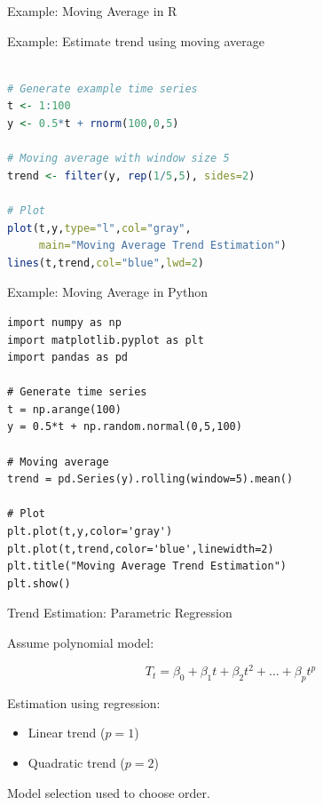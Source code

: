 \documentclass[aspectratio=169]{beamer}
\begin{document}
\begin{frame}[fragile]{Example: Moving Average in R}

Example: Estimate trend using moving average

\begin{lstlisting}[language=R]

# Generate example time series
t <- 1:100
y <- 0.5*t + rnorm(100,0,5)

# Moving average with window size 5
trend <- filter(y, rep(1/5,5), sides=2)

# Plot
plot(t,y,type="l",col="gray",
     main="Moving Average Trend Estimation")
lines(t,trend,col="blue",lwd=2)

\end{lstlisting}

\end{frame}
\begin{frame}[fragile]{Example: Moving Average in Python}

\begin{lstlisting}
import numpy as np
import matplotlib.pyplot as plt
import pandas as pd

# Generate time series
t = np.arange(100)
y = 0.5*t + np.random.normal(0,5,100)

# Moving average
trend = pd.Series(y).rolling(window=5).mean()

# Plot
plt.plot(t,y,color='gray')
plt.plot(t,trend,color='blue',linewidth=2)
plt.title("Moving Average Trend Estimation")
plt.show()
\end{lstlisting}

\end{frame}



\begin{frame}{Trend Estimation: Parametric Regression}

Assume polynomial model:

\[
T_t =
\beta_0
+
\beta_1 t
+
\beta_2 t^2
+
\dots
+
\beta_p t^p
\]

Estimation using regression:

\begin{itemize}

\item Linear trend ($p=1$)

\item Quadratic trend ($p=2$)

\end{itemize}

Model selection used to choose order.

\end{frame}
\end{document}
